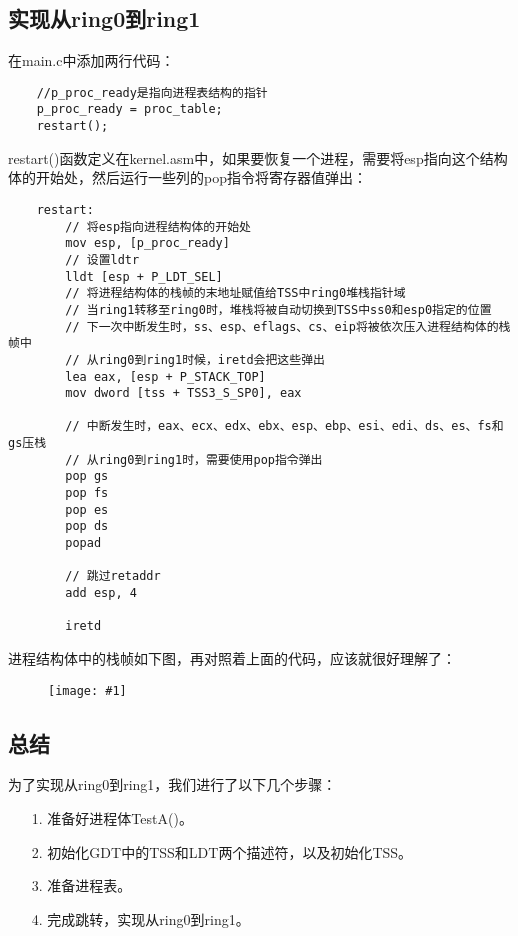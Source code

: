 \documentclass[a4paper,left=2.5cm,right=2.5cm,11pt]{report}
\newcommand{\fic}[1]{\begin{figure}[H]
		\center
		\texttt{[image: \#1]}
	\end{figure}}
\begin{document}
\subsection{实现从ring0到ring1}
	在main.c中添加两行代码：
	\begin{lstlisting}
	//p_proc_ready是指向进程表结构的指针
	p_proc_ready = proc_table;
	restart();
	\end{lstlisting}

	restart()函数定义在kernel.asm中，如果要恢复一个进程，需要将esp指向这个结构体的开始处，然后运行一些列的pop指令将寄存器值弹出：
	\begin{lstlisting}
	restart:
		// 将esp指向进程结构体的开始处
		mov esp, [p_proc_ready]
		// 设置ldtr
		lldt [esp + P_LDT_SEL]
		// 将进程结构体的栈帧的末地址赋值给TSS中ring0堆栈指针域
		// 当ring1转移至ring0时，堆栈将被自动切换到TSS中ss0和esp0指定的位置
		// 下一次中断发生时，ss、esp、eflags、cs、eip将被依次压入进程结构体的栈帧中
		// 从ring0到ring1时候，iretd会把这些弹出
		lea eax, [esp + P_STACK_TOP]
		mov dword [tss + TSS3_S_SP0], eax

		// 中断发生时，eax、ecx、edx、ebx、esp、ebp、esi、edi、ds、es、fs和gs压栈
		// 从ring0到ring1时，需要使用pop指令弹出
		pop gs
		pop fs
		pop es
		pop ds
		popad

		// 跳过retaddr
		add esp, 4

		iretd
	\end{lstlisting}

	进程结构体中的栈帧如下图，再对照着上面的代码，应该就很好理解了：
	\fic{3.png}

\subsection{总结}
	为了实现从ring0到ring1，我们进行了以下几个步骤：
	\begin{itemize}
		\item[1.] 准备好进程体TestA()。
		\item[2.] 初始化GDT中的TSS和LDT两个描述符，以及初始化TSS。
		\item[3.] 准备进程表。
		\item[4.] 完成跳转，实现从ring0到ring1。
	\end{itemize}
\end{document}
